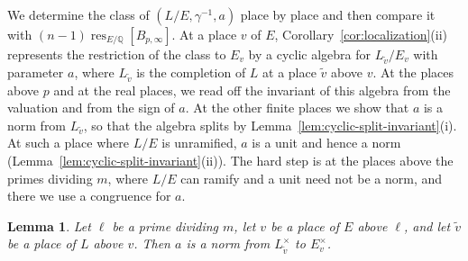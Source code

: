 \documentclass[a4paper,11pt]{amsart}
\newtheorem{lemma}[theorem]{Lemma}
\theoremstyle{definition}
\theoremstyle{remark}
\numberwithin{equation}{section}
\newcommand{\Q}{\mathbb{Q}}
\DeclareMathOperator{\res}{res}
\begin{document}
We determine the class of $(L/E,\gamma^{-1},a)$ place by place and then compare it with $(n-1)\res_{E/\Q}[B_{p,\infty}]$. At a place $v$ of $E$, Corollary~\ref{cor:localization}(ii) represents the restriction of the class to $E_v$ by a cyclic algebra for $L_{\tilde v}/E_v$ with parameter $a$, where $L_{\tilde v}$ is the completion of $L$ at a place $\tilde v$ above $v$. At the places above $p$ and at the real places, we read off the invariant of this algebra from the valuation and from the sign of $a$. At the other finite places we show that $a$ is a norm from $L_{\tilde v}$, so that the algebra splits by Lemma~\ref{lem:cyclic-split-invariant}(i). At such a place where $L/E$ is unramified, $a$ is a unit and hence a norm (Lemma~\ref{lem:cyclic-split-invariant}(ii)). The hard step is at the places above the primes dividing $m$, where $L/E$ can ramify and a unit need not be a norm, and there we use a congruence for $a$.

\begin{lemma}\label{lem:norm-above-m}
Let $\ell$ be a prime dividing $m$, let $v$ be a place of $E$ above $\ell$, and let $\tilde v$ be a place of $L$ above $v$. Then $a$ is a norm from $L_{\tilde v}^\times$ to $E_v^\times$.
\end{lemma}
\end{document}
